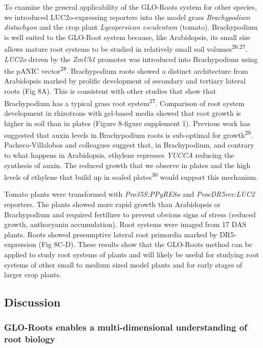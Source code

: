 \documentclass[]{article}
\begin{document}
To examine the general applicability of the GLO-Roots system for other
species, we introduced LUC2o-expressing reporters into the model grass
\emph{Brachypodium distachyon} and the crop plant \emph{Lycopersicon
esculentum} (tomato). Brachypodium is well suited to the GLO-Root system
because, like Arabidopsis, its small size allows mature root systems to
be studied in relatively small soil volumes\textsuperscript{26,27}.
\emph{LUC2o} driven by the \emph{ZmUb1} promoter was introduced into
Brachypodium using the pANIC vector\textsuperscript{28}. Brachypodium
roots showed a distinct architecture from Arabidopsis marked by prolific
development of secondary and tertiary lateral roots (Fig 8A). This is
consistent with other studies that show that Brachypodium has a typical
grass root system\textsuperscript{27}. Comparison of root system
development in rhizotrons with gel-based media showed that root growth
is higher in soil than in plates (Figure 8-figure supplement 1).
Previous work has suggested that auxin levels in Brachypodium roots is
sub-optimal for growth\textsuperscript{29}. Pacheco-Villalobos and
colleagues suggest that, in Brachypodium, and contrary to what happens
in Arabidopsis, ethylene represses \emph{YUCCA} reducing the synthesis
of auxin. The reduced growth that we observe in plates and the high
levels of ethylene that build up in sealed plates\textsuperscript{30}
would support this mechanism.

Tomato plants were transformed with \emph{Pro35S:PPyRE8o} and
\emph{ProeDR5rev:LUC2} reporters. The plants showed more rapid growth
than Arabidopsis or Brachypodium and required fertilizer to prevent
obvious signs of stress (reduced growth, anthocyanin accumulation). Root
systems were imaged from 17 DAS plants. Roots showed presumptive lateral
root primordia marked by DR5-expression (Fig 8C-D). These results show
that the GLO-Roots method can be applied to study root systems of plants
and will likely be useful for studying root systems of other small to
medium sized model plants and for early stages of larger crop plants.

\subsection{Discussion}\label{discussion}

\subsubsection{GLO-Roots enables a multi-dimensional understanding of
root
biology}\label{glo-roots-enables-a-multi-dimensional-understanding-of-root-biology}
\end{document}
